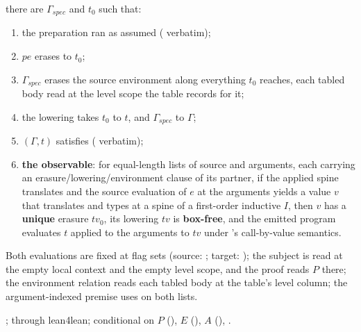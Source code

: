 \begin{theorem}
 there are $\Gamma_{spec}$ and $t_0$ such that:
\begin{enumerate}
\item the preparation ran as assumed ( verbatim);
\item $pe$ erases to $t_0$;
\item $\Gamma_{spec}$ erases the source environment along everything $t_0$ reaches, each tabled
body read at the level scope the table records for it;
\item the lowering takes $t_0$ to $t$, and $\Gamma_{spec}$ to $\Gamma$;
\item $(\Gamma,t)$ satisfies  ( verbatim);
\item \textbf{the observable}: for equal-length lists of source and \lbox{} arguments, each carrying
an erasure/lowering/environment clause of its partner, if the applied spine translates and the source
evaluation of $e$ at the arguments yields a value $v$ that translates and types at a spine of a
first-order inductive $I$, then $v$ has a \textbf{unique} erasure $tv_0$, its lowering $tv$ is
\textbf{box-free}, and the emitted program evaluates $t$ applied to the arguments to $tv$ under
\lbox{}'s call-by-value semantics.
\end{enumerate}

 Both evaluations are fixed at flag sets (source: ; target:
); the subject is read at the empty local context and the empty level scope, and
the proof reads $P$ there; the environment relation reads each tabled body at the table's level
column; the argument-indexed premise uses  on both lists.

 \stProved{}; \stInherited{} through lean4lean; conditional on \stAssumed{} $P$
(), $E$ (), $A$ (), .
\end{theorem}

